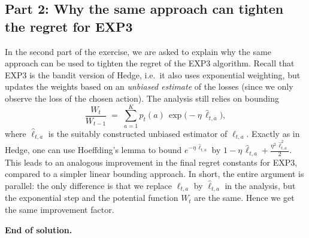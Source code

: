 \subsection*{Part 2: Why the same approach can tighten the regret for EXP3}
In the second part of the exercise, we are asked to explain why the same approach can be used to tighten the regret of the EXP3 algorithm.  Recall that EXP3 is the bandit version of Hedge, i.e.\ it also uses exponential weighting, but updates the weights based on an \emph{unbiased estimate} of the losses (since we only observe the loss of the chosen action).  The analysis still relies on bounding 
\[
\frac{W_t}{W_{t-1}}
\;=\;\sum_{a=1}^K p_t(a)\,\exp\!\bigl(-\eta\,\widehat{\ell}_{t,a}\bigr),
\]
where $\widehat{\ell}_{t,a}$ is the suitably constructed unbiased estimator of $\ell_{t,a}$.  Exactly as in Hedge, one can use Hoeffding's lemma to bound $e^{-\eta\,\widehat{\ell}_{t,a}}$ by $1 - \eta\,\widehat{\ell}_{t,a} + \frac{\eta^2\,\widehat{\ell}_{t,a}^2}{2}$.  This leads to an analogous improvement in the final regret constants for EXP3, compared to a simpler linear bounding approach.  In short, the entire argument is parallel: the only difference is that we replace $\ell_{t,a}$ by $\widehat{\ell}_{t,a}$ in the analysis, but the exponential step and the potential function $W_t$ are the same.  Hence we get the same improvement factor.

\bigskip

\noindent
\textbf{End of solution.}

